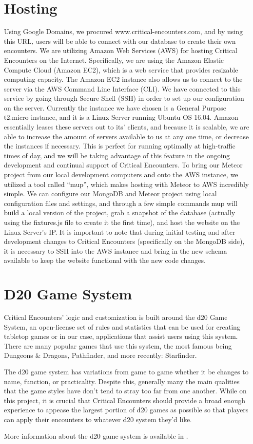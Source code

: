 \documentclass[letterpaper, 10 pt, conference]{ieeeconf}
\begin{document}
\section{Hosting}
Using Google Domains, we procured www.critical-encounters.com, and by using this URL, users will be able to connect with our database to create their own encounters.
We are utilizing Amazon Web Services (AWS) for hosting Critical Encounters on the Internet.  Specifically, we are using the Amazon Elastic Compute Cloud (Amazon EC2), which is a web service that provides resizable computing capacity. The Amazon EC2 instance also allows us to connect to the server via the AWS Command Line Interface (CLI). We have connected to this service by going through Secure Shell (SSH) in order to set up our configuration on the server. Currently the instance we have chosen is a General Purpose t2.micro instance, and it is a Linux Server running Ubuntu OS 16.04. Amazon essentially leases these servers out to its' clients, and because it is scalable, we are able to increase the amount of servers available to us at any one time, or decrease the instances if necessary. This is perfect for running optimally at high-traffic times of day, and we will be taking advantage of this feature in the ongoing development and continual support of Critical Encounters. To bring our Meteor project from our local development computers and onto the AWS instance, we utilized a tool called ``mup'', which makes hosting with Meteor to AWS incredibly simple. We can configure our MongoDB and Meteor project using local configuration files and settings, and through a few simple commands mup will build a local version of the project, grab a snapshot of the database (actually using the fixtures.js file to create it the first time), and host the website on the Linux Server's IP. It is important to note that during initial testing and after development changes to Critical Encounters (specifically on the MongoDB side), it is necessary to SSH into the AWS instance and bring in the new schema available to keep the website functional with the new code changes.
\section{D20 Game System}
Critical Encounters' logic and customization is built around the d20 Game System, an open-license set of rules and statistics that can be used for creating tabletop games or in our case, applications that assist users using this system. There are many popular games that use this system, the most famous being Dungeons \& Dragons, Pathfinder, and more recently: Starfinder. \par
The d20 game system has variations from game to game whether it be changes
to name, function, or practicality. Despite this, generally many the main qualities
that the game styles have don’t tend to stray too far from one another. While on
this project, it is crucial that Critical Encounters should provide a broad enough
experience to appease the largest portion of d20 games as possible so that players
can apply their encounters to whatever d20 system they’d like. \par
More information about the d20 game system is available in \cite{c4}.
\end{document}
